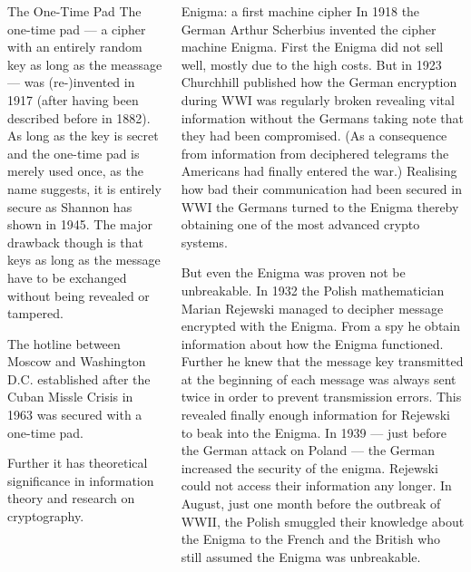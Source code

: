 \documentclass[final,hyperref={pdfpagelabels=false}]{beamer}
\begin{document}
\begin{frame}{}
\begin{columns}[t]
\begin{column}{.3\linewidth}
        \begin{block}{The One-Time Pad}
          The one-time pad --- a cipher with an entirely random key as long as the meassage --- was (re-)invented in 1917 (after having been described before in 1882). As long as the key is secret and the one-time pad is merely used once, as the name suggests, it is entirely secure as Shannon has shown in 1945. The major drawback though is that keys as long as the message have to be exchanged without being revealed or tampered. \par
          The hotline between Moscow and Washington D.C. established after the Cuban Missle Crisis in 1963 was secured with a one-time pad. \par
          Further it has theoretical significance in information theory and research on cryptography.
        \end{block}
    \end{column}
    \begin{column}{.3\linewidth}
        \begin{block}{Enigma: a first machine cipher}
          In  1918 the German Arthur Scherbius invented the cipher machine Enigma. First the Enigma did not sell well, mostly due to the high costs. But in 1923 Churchhill published how the German encryption during WWI was regularly broken revealing vital information without the Germans taking note that they had been compromised. (As a consequence from information from deciphered telegrams the Americans had finally entered the war.) Realising how bad their communication had been secured in WWI the Germans turned to the Enigma thereby obtaining one of the most advanced crypto systems. \par
          But even the Enigma was proven not be unbreakable. In 1932 the Polish mathematician Marian Rejewski managed to decipher message encrypted with the Enigma. From a spy he obtain information about how the Enigma functioned. Further he knew that the message key transmitted at the beginning of each message was always sent twice in order to prevent transmission errors. This revealed finally enough information for Rejewski to beak into the Enigma. In 1939 --- just before the German attack on Poland --- the German  increased the security of the enigma. Rejewski could not access their information any longer. In August, just one month before the outbreak of WWII, the Polish smuggled their knowledge about the Enigma to the French and the British who still assumed the Enigma was unbreakable. \par

\end{block}
\end{column}
\end{columns}
\end{frame}
\end{document}
